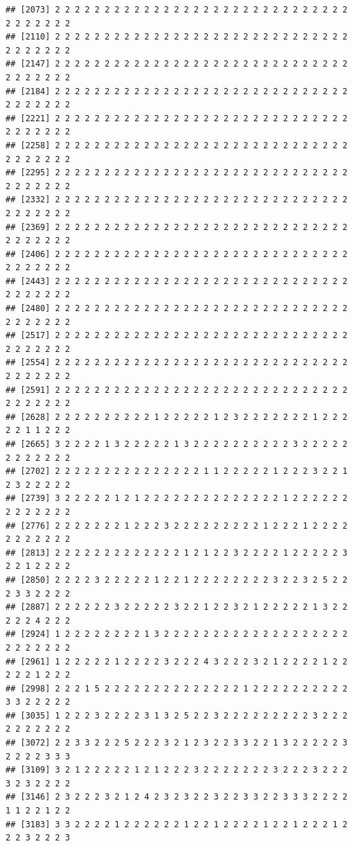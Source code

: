 \documentclass[
]{article}
\begin{document}
\begin{verbatim}
## [2073] 2 2 2 2 2 2 2 2 2 2 2 2 2 2 2 2 2 2 2 2 2 2 2 2 2 2 2 2 2 2 2 2 2 2 2 2 2
## [2110] 2 2 2 2 2 2 2 2 2 2 2 2 2 2 2 2 2 2 2 2 2 2 2 2 2 2 2 2 2 2 2 2 2 2 2 2 2
## [2147] 2 2 2 2 2 2 2 2 2 2 2 2 2 2 2 2 2 2 2 2 2 2 2 2 2 2 2 2 2 2 2 2 2 2 2 2 2
## [2184] 2 2 2 2 2 2 2 2 2 2 2 2 2 2 2 2 2 2 2 2 2 2 2 2 2 2 2 2 2 2 2 2 2 2 2 2 2
## [2221] 2 2 2 2 2 2 2 2 2 2 2 2 2 2 2 2 2 2 2 2 2 2 2 2 2 2 2 2 2 2 2 2 2 2 2 2 2
## [2258] 2 2 2 2 2 2 2 2 2 2 2 2 2 2 2 2 2 2 2 2 2 2 2 2 2 2 2 2 2 2 2 2 2 2 2 2 2
## [2295] 2 2 2 2 2 2 2 2 2 2 2 2 2 2 2 2 2 2 2 2 2 2 2 2 2 2 2 2 2 2 2 2 2 2 2 2 2
## [2332] 2 2 2 2 2 2 2 2 2 2 2 2 2 2 2 2 2 2 2 2 2 2 2 2 2 2 2 2 2 2 2 2 2 2 2 2 2
## [2369] 2 2 2 2 2 2 2 2 2 2 2 2 2 2 2 2 2 2 2 2 2 2 2 2 2 2 2 2 2 2 2 2 2 2 2 2 2
## [2406] 2 2 2 2 2 2 2 2 2 2 2 2 2 2 2 2 2 2 2 2 2 2 2 2 2 2 2 2 2 2 2 2 2 2 2 2 2
## [2443] 2 2 2 2 2 2 2 2 2 2 2 2 2 2 2 2 2 2 2 2 2 2 2 2 2 2 2 2 2 2 2 2 2 2 2 2 2
## [2480] 2 2 2 2 2 2 2 2 2 2 2 2 2 2 2 2 2 2 2 2 2 2 2 2 2 2 2 2 2 2 2 2 2 2 2 2 2
## [2517] 2 2 2 2 2 2 2 2 2 2 2 2 2 2 2 2 2 2 2 2 2 2 2 2 2 2 2 2 2 2 2 2 2 2 2 2 2
## [2554] 2 2 2 2 2 2 2 2 2 2 2 2 2 2 2 2 2 2 2 2 2 2 2 2 2 2 2 2 2 2 2 2 2 2 2 2 2
## [2591] 2 2 2 2 2 2 2 2 2 2 2 2 2 2 2 2 2 2 2 2 2 2 2 2 2 2 2 2 2 2 2 2 2 2 2 2 2
## [2628] 2 2 2 2 2 2 2 2 2 2 1 2 2 2 2 2 1 2 3 2 2 2 2 2 2 2 1 2 2 2 2 2 1 1 2 2 2
## [2665] 3 2 2 2 2 1 3 2 2 2 2 2 1 3 2 2 2 2 2 2 2 2 2 2 3 2 2 2 2 2 2 2 2 2 2 2 2
## [2702] 2 2 2 2 2 2 2 2 2 2 2 2 2 2 2 1 1 2 2 2 2 2 1 2 2 2 3 2 2 1 2 3 2 2 2 2 2
## [2739] 3 2 2 2 2 2 1 2 1 2 2 2 2 2 2 2 2 2 2 2 2 2 2 1 2 2 2 2 2 2 2 2 2 2 2 2 2
## [2776] 2 2 2 2 2 2 2 1 2 2 2 3 2 2 2 2 2 2 2 2 2 1 2 2 2 1 2 2 2 2 2 2 2 2 2 2 2
## [2813] 2 2 2 2 2 2 2 2 2 2 2 2 2 1 2 1 2 2 3 2 2 2 2 1 2 2 2 2 2 3 2 2 1 2 2 2 2
## [2850] 2 2 2 2 3 2 2 2 2 2 1 2 2 1 2 2 2 2 2 2 2 2 3 2 2 3 2 5 2 2 2 3 3 2 2 2 2
## [2887] 2 2 2 2 2 2 3 2 2 2 2 2 3 2 2 1 2 2 3 2 1 2 2 2 2 2 1 3 2 2 2 2 2 4 2 2 2
## [2924] 1 2 2 2 2 2 2 2 2 1 3 2 2 2 2 2 2 2 2 2 2 2 2 2 2 2 2 2 2 2 2 2 2 2 2 2 2
## [2961] 1 2 2 2 2 2 1 2 2 2 2 3 2 2 2 4 3 2 2 2 3 2 1 2 2 2 2 1 2 2 2 2 2 1 2 2 2
## [2998] 2 2 2 1 5 2 2 2 2 2 2 2 2 2 2 2 2 2 2 1 2 2 2 2 2 2 2 2 2 2 3 3 2 2 2 2 2
## [3035] 1 2 2 2 3 2 2 2 2 3 1 3 2 5 2 2 3 2 2 2 2 2 2 2 2 2 3 2 2 2 2 2 2 2 2 2 2
## [3072] 2 2 3 3 2 2 2 5 2 2 2 3 2 1 2 3 2 2 3 3 2 2 1 3 2 2 2 2 2 3 2 2 2 2 3 3 3
## [3109] 3 2 1 2 2 2 2 2 1 2 1 2 2 2 3 2 2 2 2 2 2 2 3 2 2 2 3 2 2 2 3 2 3 2 2 2 2
## [3146] 2 3 2 2 2 3 2 1 2 4 2 3 2 3 2 2 3 2 2 3 3 2 2 3 3 3 2 2 2 2 1 1 2 2 1 2 2
## [3183] 3 3 2 2 2 2 1 2 2 2 2 2 2 1 2 2 1 2 2 2 2 1 2 2 1 2 2 2 1 2 2 2 3 2 2 2 3

\end{verbatim}
\end{document}
